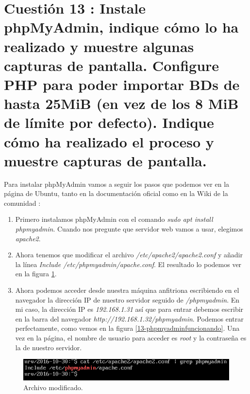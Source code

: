 \documentclass[a4paper,titlepage,12pt]{scrartcl}	%
\numberwithin{figure}{section} %
\numberwithin{table}{section} %
\begin{document}
	\section[Cuestión 13 : Instale phpMyAdmin, indique cómo lo ha realizado y muestre algunas capturas de pantalla. Configure PHP para poder importar BDs de hasta 25MiB (en vez de los 8 MiB de límite por defecto). Indique cómo ha realizado el proceso y muestre capturas de pantalla.]{Cuestión 13 : Instale phpMyAdmin, indique cómo lo ha realizado y muestre algunas capturas de pantalla. Configure PHP para poder importar BDs de hasta 25MiB (en vez de los 8 MiB de límite por defecto). Indique cómo ha realizado el proceso y muestre capturas de pantalla.}
	
	Para instalar phpMyAdmin vamos a seguir los pasos que podemos ver en la página de Ubuntu, tanto en la documentación oficial \cite{phpmyadminubuntu} como en la Wiki de la comunidad \cite{phpmyadminubuntuwiki}:
	\begin{enumerate}
		\item Primero instalamos phpMyAdmin con el comando \textit{sudo apt install phpmyadmin}. Cuando nos pregunte que servidor web vamos a usar, elegimos \textit{apache2}.
		\item Ahora tenemos que modificar el archivo \textit{/etc/apache2/apache2.conf} y añadir la línea \textit{Include /etc/phpmyadmin/apache.conf}. El resultado lo podemos ver en la figura \ref{13-phpmyadmin}.
		\item Ahora podemos acceder desde nuestra máquina anfitriona escribiendo en el navegador la dirección IP de nuestro servidor seguido de \textit{/phpmyadmin}. En mi caso, la dirección IP es \textit{192.168.1.31} así que para entrar debemos escribir en la barra del navegador \textit{http://192.168.1.32/phpmyadmin}. Podemos entrar perfectamente, como vemos en la figura \ref{13-phpmyadminfuncionando}. Una vez en la página, el nombre de usuario para acceder es \textit{root} y la contraseña es la de nuestro servidor.
	\end{enumerate}
	
	\begin{figure}[H]
		\includegraphics[width=\linewidth]{./Imagenes/13-includephpmyadmin.png}
		\vspace{-0.5cm}
		\caption[Archivo modificado.]{Archivo modificado.}
		\label{13-phpmyadmin}
	\end{figure}
	
\end{document}
